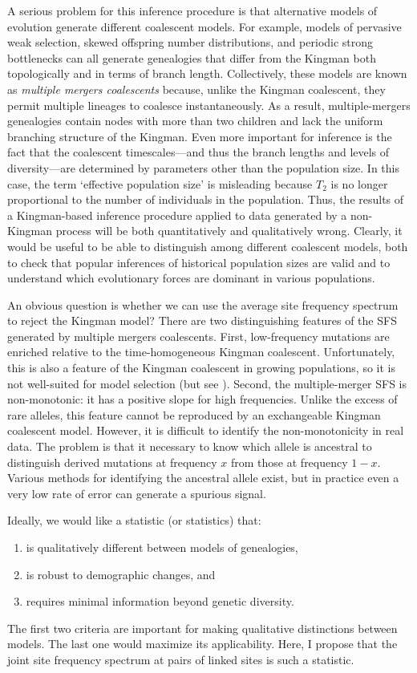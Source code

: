 \documentclass[11pt, letterpaper]{article}   	%
\begin{document}
A serious problem for this inference procedure is that alternative models of evolution generate different coalescent models.
For example, models of pervasive weak selection, skewed offspring number distributions, and periodic strong bottlenecks can all generate genealogies that differ from the Kingman both topologically and in terms of branch length.
Collectively, these models are known as \emph{multiple mergers coalescents} because, unlike the Kingman coalescent, they permit multiple lineages to coalesce instantaneously.
As a result, multiple-mergers genealogies contain nodes with more than two children and lack the uniform branching structure of the Kingman.
Even more important for inference is the fact that the coalescent timescales---and thus the branch lengths and levels of diversity---are determined by parameters other than the population size.
In this case, the term `effective population size' is misleading because $T_2$ is no longer proportional to the number of individuals in the population.
Thus, the results of a Kingman-based inference procedure applied to data generated by a non-Kingman process will be both quantitatively and qualitatively wrong.
Clearly, it would be useful to be able to distinguish among different coalescent models, both to check that popular inferences of historical population sizes are valid and to understand which evolutionary forces are dominant in various populations.

An obvious question is whether we can use the average site frequency spectrum to reject the Kingman model?
There are two distinguishing features of the SFS generated by multiple mergers coalescents.
First, low-frequency mutations are enriched relative to the time-homogeneous Kingman coalescent.
Unfortunately, this is also a feature of the Kingman coalescent in growing populations, so it is not well-suited for model selection (but see \cite{}).
Second, the multiple-merger SFS is non-monotonic: it has a positive slope for high frequencies.
Unlike the excess of rare alleles, this feature cannot be reproduced by an exchangeable Kingman coalescent model.
However, it is difficult to identify the non-monotonicity in real data.
The problem is that it necessary to know which allele is ancestral to distinguish derived mutations at frequency $x$ from those at frequency $1-x$.
Various methods for identifying the ancestral allele exist, but in practice even a very low rate of error can generate a spurious signal.

Ideally, we would like a statistic (or statistics) that:
\begin{enumerate}
\item is qualitatively different between models of genealogies,
\item is robust to demographic changes, and 
\item requires minimal information beyond genetic diversity.
\end{enumerate}
The first two criteria are important for making qualitative distinctions between models. The last one would maximize its applicability.
Here, I propose that the joint site frequency spectrum at pairs of linked sites is such a statistic.
\end{document}
